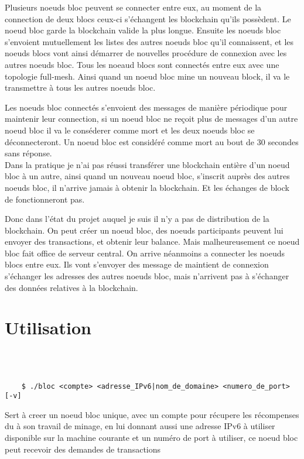 \documentclass[a4paper,11pt,DIV=12]{scrreprt}
\begin{document}
    Plusieurs noeuds bloc peuvent se connecter entre eux, au moment de la
    connection de deux blocs ceux-ci s'échangent les blockchain qu'ils
    possèdent. Le noeud bloc garde la blockchain valide la plus longue.
    Ensuite les noeuds bloc s'envoient mutuellement les listes des
    autres noeuds bloc qu'il connaissent, et les noeuds blocs vont ainsi démarrer de nouvelles
    procédure de connexion avec les autres noeuds bloc. Tous les noeaud blocs sont
    connectés entre eux avec une topologie full-mesh. Ainsi quand un noeud bloc
    mine un nouveau block, il va le transmettre à tous les autres noeuds bloc. 

    Les noeuds bloc connectés s'envoient des messages de manière périodique pour
    maintenir leur connection, si un noeud bloc ne reçoit plus de messages d'un
    autre noeud bloc il va le conséderer comme mort et les deux noeuds bloc se
    déconnecteront. Un noeud bloc est considéré comme mort au bout de 30 secondes
    sans réponse.
    \\

    Dans la pratique je n'ai pas réussi transférer une blockchain entière d'un
    noeud bloc à un autre, ainsi quand un nouveau noeud bloc, s'inscrit auprès
    des autres noeuds bloc, il n'arrive jamais à obtenir la blockchain. Et les
    échanges de block de fonctionneront pas.

    Donc dans l'état du projet auquel je suis il n'y a pas de distribution de
    la blockchain. On peut créer un noeud bloc, des noeuds participants peuvent
    lui envoyer des transactions, et obtenir leur balance. Mais malheureusement
    ce noeud bloc fait office de serveur central. On arrive néanmoins a
    connecter les noeuds blocs entre eux. Ils vont s'envoyer des message de
    maintient de connexion s'échanger les adresses des autres noeuds bloc, mais
    n'arrivent pas à s'échanger des données relatives à la blockchain.

    \chapter{Utilisation}

    \ \\ \\

    \begin{lstlisting}
    $ ./bloc <compte> <adresse_IPv6|nom_de_domaine> <numero_de_port> [-v]
    \end{lstlisting}

    Sert à creer un noeud bloc unique, avec un compte pour récupere les
    récompenses du à son travail de minage, en lui donnant aussi une adresse IPv6 à utiliser
    disponible sur la machine courante et un numéro de port à utiliser, 
    ce noeud bloc peut recevoir des demandes de transactions 
    \\ \\
\end{document}
